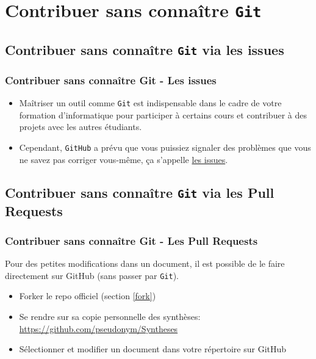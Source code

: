 \documentclass{beamer}
\begin{document}
\section{Contribuer sans connaître \texttt{Git}}

\subsection{Contribuer sans connaître \texttt{Git} via les issues}

\begin{frame}
    \frametitle{Contribuer sans connaître Git - Les issues}
    \begin{itemize}
        \item Ma\^itriser un outil comme \lstinline|Git| est indispensable dans le
            cadre de votre formation d'informatique pour participer à
            certains cours et contribuer à des projets avec les autres
            étudiants.
        \item Cependant, \lstinline|GitHub| a prévu que vous puissiez signaler des
            problèmes que vous ne savez pas corriger vous-même, ça
            s'appelle \href{https://github.com/Gp2mv3/Syntheses/issues}{les issues}.
    \end{itemize}
\end{frame}

\subsection{Contribuer sans connaître \texttt{Git} via les Pull Requests}

\begin{frame}
    \frametitle{Contribuer sans connaître Git - Les Pull Requests}
    Pour des petites modifications dans un document, il est possible de le faire directement sur GitHub (sans passer par \lstinline|Git|).
    \begin{itemize}
        \item Forker le repo officiel (section \ref{fork})
        \item Se rendre sur sa copie personnelle des synthèses: \url{https://github.com/pseudonym/Syntheses}
        \item Sélectionner et modifier un document dans votre répertoire sur GitHub
    \end{itemize}
\end{frame}
\end{document}
